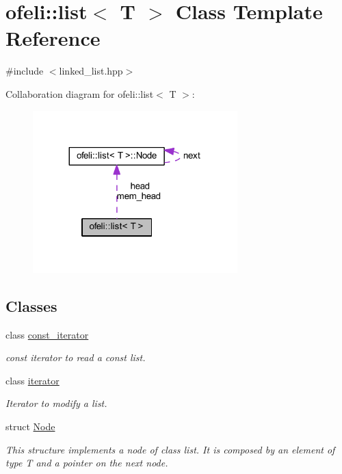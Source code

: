 \hypertarget{classofeli_1_1list}{\section{ofeli\-:\-:list$<$ T $>$ Class Template Reference}
\label{classofeli_1_1list}
}


{\ttfamily \#include $<$linked\-\_\-list.\-hpp$>$}



Collaboration diagram for ofeli\-:\-:list$<$ T $>$\-:\nopagebreak
\begin{figure}[H]
\begin{center}
\leavevmode
\includegraphics[width=224pt]{classofeli_1_1list__coll__graph}
\end{center}
\end{figure}
\subsection*{Classes}
\begin{DoxyCompactItemize}
\item 
class \hyperlink{classofeli_1_1list_1_1const__iterator}{const\-\_\-iterator}
\begin{DoxyCompactList}\small\item\em const iterator to read a const list. \end{DoxyCompactList}\item 
class \hyperlink{classofeli_1_1list_1_1iterator}{iterator}
\begin{DoxyCompactList}\small\item\em Iterator to modify a list. \end{DoxyCompactList}\item 
struct \hyperlink{structofeli_1_1list_1_1_node}{Node}
\begin{DoxyCompactList}\small\item\em This structure implements a node of class {\itshape list}. It is composed by an element of type {\itshape T} and a pointer on the next node. \end{DoxyCompactList}\end{DoxyCompactItemize}
